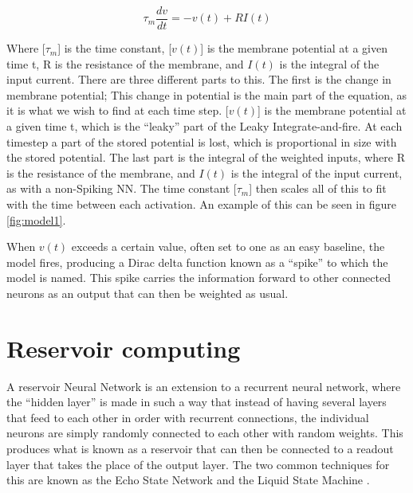 \begin{equation}
\tau_m\frac{dv}{dt} = -v(t) + RI(t)
\end{equation}

Where [$\tau_m$] is the time constant, [$v(t)$] is the membrane potential at a given time t, R is the resistance of the membrane, and $I(t)$ is the integral of the input current.
There are three different parts to this. The first is the change in membrane potential; This change in potential is the main part of the equation, as it is what we wish to find at each time step. [$v(t)$] is the membrane potential at a given time t, which is the ``leaky'' part of the Leaky Integrate-and-fire. At each timestep a part of the stored potential is lost, which is proportional in size with the stored potential. The last part is the integral of the weighted inputs, where R is the resistance of the membrane, and $I(t)$ is the integral of the input current, as with a non-Spiking NN. The time constant [$\tau_m$] then scales all of this to fit with the time between each activation. An example of this can be seen in figure \ref{fig:model1}.

When $v(t)$ exceeds a certain value, often set to one as an easy baseline, the model fires, producing a Dirac delta function known as a ``spike'' to which the model is named. This spike carries the information forward to other connected neurons as an output that can then be weighted as usual.

\section{Reservoir computing}

A reservoir Neural Network is an extension to a recurrent neural network, where the ``hidden layer'' is made in such a way that instead of having several layers that feed to each other in order with recurrent connections, the individual neurons are simply randomly connected to each other with random weights. This produces what is known as a reservoir that can then be connected to a readout layer that takes the place of the output layer. The two common techniques for this are known as the Echo State Network and the Liquid State Machine \cite{leaky}.